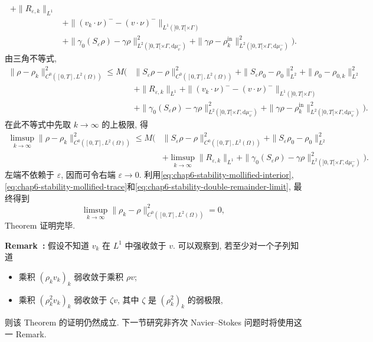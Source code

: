 \begin{sloppypar}
\begin{Proof}
\begin{itemize}
\[\begin{aligned}
 +\|R_{\varepsilon,k}\|_{L^1}\\
 &+\|(v_k\cdot\nu)^--(v\cdot\nu)^-\|_{L^1(]0,T[\times\Gamma)}\\
 &+\|\gamma_0(S_\varepsilon\rho)-\gamma\rho\|_{L^2(]0,T[\times\Gamma,\mathrm d\mu_v^-)}^2
 +\|\gamma\rho-\rho_k^{\mathrm{in}}\|_{L^2(]0,T[\times\Gamma,\mathrm d\mu_v^-)}^2\Big).
 \end{aligned}
 \]
 由三角不等式,
 \[
 \begin{aligned}
 \|\rho-\rho_k\|_{C^0([0,T],L^2(\Omega))}^2
 \leq M\Big(&\|S_\varepsilon\rho-\rho\|_{C^0([0,T],L^2(\Omega))}^2
 +\|S_\varepsilon\rho_0-\rho_0\|_{L^2}^2
 +\|\rho_0-\rho_{0,k}\|_{L^2}^2\\
 &+\|R_{\varepsilon,k}\|_{L^1}
 +\|(v_k\cdot\nu)^--(v\cdot\nu)^-\|_{L^1(]0,T[\times\Gamma)}\\
 &+\|\gamma_0(S_\varepsilon\rho)-\gamma\rho\|_{L^2(]0,T[\times\Gamma,\mathrm d\mu_v^-)}^2
 +\|\gamma\rho-\rho_k^{\mathrm{in}}\|_{L^2(]0,T[\times\Gamma,\mathrm d\mu_v^-)}^2\Big).
 \end{aligned}
 \]
 在此不等式中先取 $k\to\infty$ 的上极限, 得
 \[
 \begin{aligned}
 \limsup_{k\to\infty}\|\rho-\rho_k\|_{C^0([0,T],L^2(\Omega))}^2
 \leq M\Big(&\|S_\varepsilon\rho-\rho\|_{C^0([0,T],L^2(\Omega))}^2
 +\|S_\varepsilon\rho_0-\rho_0\|_{L^2}^2\\
 &+\limsup_{k\to\infty}\|R_{\varepsilon,k}\|_{L^1}
 +\|\gamma_0(S_\varepsilon\rho)-\gamma\rho\|_{L^2(]0,T[\times\Gamma,\mathrm d\mu_v^-)}^2\Big).
 \end{aligned}
 \]
 左端不依赖于 $\varepsilon$, 因而可令右端 $\varepsilon\to0$. 利用\eqref{eq:chap6-stability-mollified-interior}, \eqref{eq:chap6-stability-mollified-trace}和\eqref{eq:chap6-stability-double-remainder-limit}, 最终得到
 \[
  \limsup_{k\to\infty}\|\rho_k-\rho\|_{C^0([0,T],L^2(\Omega))}^2=0,
 \]
 Theorem 证明完毕.
\end{itemize}
\end{Proof}

\par\noindent{}\textbf{Remark~\thechaptersixsectiononeremark:}\label{rem:chap6-stability-products}
假设不知道 $v_k$ 在 $L^1$ 中强收敛于 $v$. 可以观察到, 若至少对一个子列知道
\begin{itemize}
 \item 乘积 $(\rho_kv_k)_k$ 弱收敛于乘积 $\rho v$;
 \item 乘积 $(\rho_k^2v_k)_k$ 弱收敛于 $\zeta v$, 其中 $\zeta$ 是 $(\rho_k^2)_k$ 的弱极限,
\end{itemize}
则该 Theorem 的证明仍然成立. 下一节研究非齐次 Navier--Stokes 问题时将使用这一 Remark.
\end{sloppypar}

